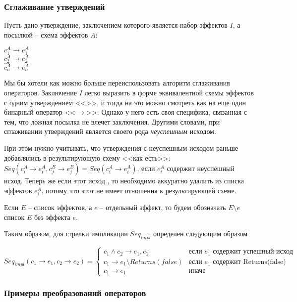\subsubsection{Сглаживание утверждений}

Пусть дано утверждение, заключением которого является набор эффектов $I$, а посылкой -- схема эффектов $A$:

{
	$c^A_1 \rightarrow e^A_1$ \\
	$c^A_2 \rightarrow e^A_2$ \\
	$\ldots$ \\
	$c^A_n \rightarrow e^A_n$ \\
}{}

Мы бы хотели как можно больше переиспользовать алгоритм сглаживания операторов. Заключение $I$ легко выразить в форме эквивалентной схемы эффектов с одним утверждением <<>>, и тогда на это можно смотреть как на еще один бинарный оператор <<$\rightarrow$>>. Однако у него есть своя специфика, связанная с тем, что ложная посылка не влечет заключения. Другими словами, при сглаживании утверждений  является своего рода \emph{неуспешным} исходом. 

При этом нужно учитывать, что утверждения с неуспешным исходом раньше добавлялись в результирующую схему <<как есть>>: $Seq(c^A_i \rightarrow e^A_i, c^B_j \rightarrow e^B_j) = Seq(c^A_i \rightarrow e^A_i)$, если $e^A_i$ содержит неуспешный исход. Теперь же если этот исход , то необходимо аккуратно удалить  из списка эффектов $e^A_i$, потому что этот  не имеет отношения к результирующей схеме. 

Если $E$ -- список эффектов, а $e$ -- отдельный эффект, то будем обозначать $E \setminus e$ список $E$ без эффекта $e$.

Таким образом, для стрелки импликации $Seq_{impl}$ определен следующим образом

\[
Seq_{impl}(c_1 \rightarrow e_1, c_2 \rightarrow e_2) = 
\begin{cases}
c_1 \land c_2 \rightarrow e_1, e_2 & \text{если } e_1 \text{ содержит успешный исход} \\
c_1 \rightarrow e_1 \setminus Returns(false) & \text{если } e_1 \text{ содержит Returns(false)} \\
c_1 \rightarrow e_1							 & \text{иначе}
\end{cases}
\]



\subsubsection{Примеры преобразований операторов}

